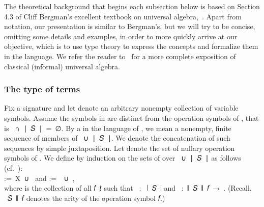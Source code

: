 The theoretical background that begins each subsection below is based on Section
4.3 of Cliff Bergman's excellent textbook on universal
algebra,~\cite[\S4.3]{Bergman:2012}. Apart from notation, our presentation is
similar to Bergman's, but we will try to be concise, omitting some details and
examples, in order to more quickly arrive at our objective, which is to use
type theory to express the concepts and formalize them in the \agda language. We
refer the reader to~\cite{Bergman:2012} for a more complete exposition of
classical (informal) universal algebra. 

\subsubsection{The type of terms}\label{the-type-of-terms}

Fix a signature  and let  denote an arbitrary nonempty collection of
variable symbols. Assume the symbols in  are distinct from the operation
symbols of , that is ~\af ∩~\af ∣~\ab 𝑆~\af ∣~\as =~∅. 
By a  in the language of , we mean a nonempty, finite sequence
of members of ~\af ∪~\af ∣~\ab 𝑆~\af ∣. We denote the concatenation of
such sequences by simple juxtaposition. Let  denote the set of nullary
operation symbols of . We define by induction on  the sets 
of  over ~\af ∪~\af ∣~\ab 𝑆~\af ∣ as follows
(cf.~\cite[Def.~4.19]{Bergman:2012}):\\[-4pt]  

 :=~\ab X~\af ∪~ and  :=~~\af ∪~,\\[6pt]
where  is the collection of all \ab 𝑓~\ab 𝑡 such that ~\as :~\af
∣~\ab 𝑆~\af ∣ and ~\as :~\af ∥~\ab 𝑆~\af ∥~\ab 𝑓~\as →~. (Recall,
~\ab 𝑆~\af ∥~\ab 𝑓 denotes the arity of the operation symbol \ab 𝑓.) 

